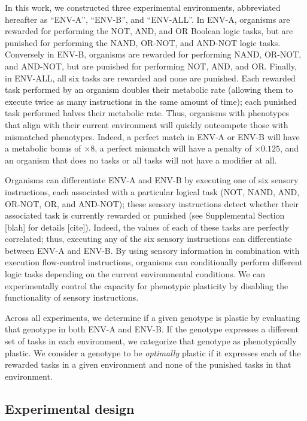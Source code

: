 In this work, we constructed three experimental environments, abbreviated hereafter as ``ENV-A'', ``ENV-B'', and ``ENV-ALL''.
In ENV-A, organisms are rewarded for performing the NOT, AND, and OR Boolean logic tasks, but are punished for performing the NAND, OR-NOT, and AND-NOT logic tasks.
Conversely in ENV-B, organisms are rewarded for performing NAND, OR-NOT, and AND-NOT, but are punished for performing NOT, AND, and OR.  
Finally, in ENV-ALL, all six tasks are rewarded and none are punished.
Each rewarded task performed by an organism doubles their metabolic rate (allowing them to execute twice as many instructions in the same amount of time); each punished task performed halves their metabolic rate.
Thus, organisms with phenotypes that align with their current environment will quickly outcompete those with mismatched phenotypes.  
Indeed, a perfect match in ENV-A or ENV-B will have a metabolic bonus of $\times{8}$, a perfect mismatch will have a penalty of $\times{0.125}$, and an organism that does no tasks or all tasks will not have a modifier at all. 

Organisms can differentiate ENV-A and ENV-B by executing one of six sensory instructions, each associated with a particular logical task (NOT, NAND, AND, OR-NOT, OR, and AND-NOT); these sensory instructions detect whether their associated task is currently rewarded or punished (see Supplemental Section [blah] for details [cite]).
Indeed, the values of each of these tasks are perfectly correlated; thus, executing any of the six sensory instructions can differentiate between ENV-A and ENV-B. 
By using sensory information in combination with execution flow-control instructions, organisms can conditionally perform different logic tasks depending on the current environmental conditions.
We can experimentally control the capacity for phenotypic plasticity by disabling the functionality of sensory instructions.

Across all experiments, we determine if a given genotype is plastic by evaluating that genotype in both ENV-A and ENV-B. 
If the genotype expresses a different set of tasks in each environment, we categorize that genotype as phenotypically plastic.
We consider a genotype to be \textit{optimally} plastic if it expresses each of the rewarded tasks in a given environment and none of the punished tasks in that environment.

\vspace{0.7cm}
\subsection{Experimental design}

